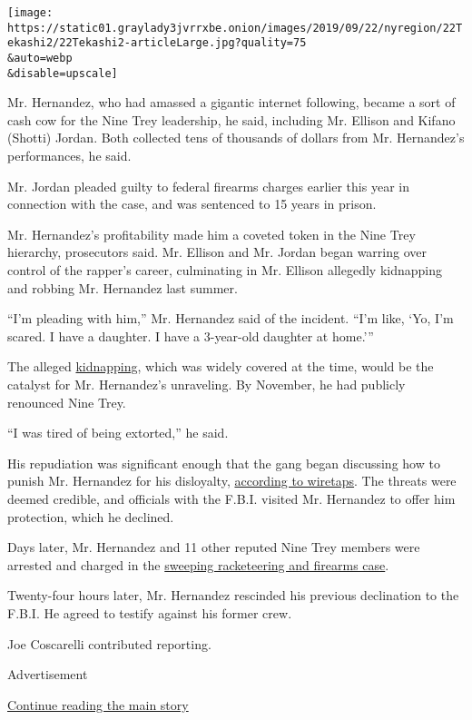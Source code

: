 \texttt{[image: https://static01.graylady3jvrrxbe.onion/images/2019/09/22/nyregion/22Tekashi2/22Tekashi2-articleLarge.jpg?quality=75\\\&auto=webp\\\&disable=upscale]}

Mr. Hernandez, who had amassed a gigantic internet following, became a
sort of cash cow for the Nine Trey leadership, he said, including Mr.
Ellison and Kifano (Shotti) Jordan. Both collected tens of thousands of
dollars from Mr. Hernandez's performances, he said.

Mr. Jordan pleaded guilty to federal firearms charges earlier this year
in connection with the case, and was sentenced to 15 years in prison.

Mr. Hernandez's profitability made him a coveted token in the Nine Trey
hierarchy, prosecutors said. Mr. Ellison and Mr. Jordan began warring
over control of the rapper's career, culminating in Mr. Ellison
allegedly kidnapping and robbing Mr. Hernandez last summer.

``I'm pleading with him,'' Mr. Hernandez said of the incident. ``I'm
like, `Yo, I'm scared. I have a daughter. I have a 3-year-old daughter
at home.'''

The alleged
\href{https://www.nytimes3xbfgragh.onion/2019/09/19/nyregion/tekashi-69-case-testimony-jim-jones.html}{kidnapping},
which was widely covered at the time, would be the catalyst for Mr.
Hernandez's unraveling. By November, he had publicly renounced Nine
Trey.

``I was tired of being extorted,'' he said.

His repudiation was significant enough that the gang began discussing
how to punish Mr. Hernandez for his disloyalty,
\href{https://www.nytimes3xbfgragh.onion/2018/11/29/nyregion/tekashi6ix9ine-jail-treyway.html}{according
to wiretaps}. The threats were deemed credible, and officials with the
F.B.I. visited Mr. Hernandez to offer him protection, which he declined.

Days later, Mr. Hernandez and 11 other reputed Nine Trey members were
arrested and charged in the
\href{https://www.nytimes3xbfgragh.onion/2018/11/19/nyregion/tekashi-6ix9ine-arrested-racketeering.html}{sweeping
racketeering and firearms case}.

Twenty-four hours later, Mr. Hernandez rescinded his previous
declination to the F.B.I. He agreed to testify against his former crew.

Joe Coscarelli contributed reporting.

Advertisement

\protect\hyperlink{after-bottom}{Continue reading the main story}

